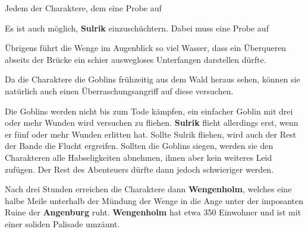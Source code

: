 Jedem der Charaktere, dem eine Probe auf 


Es ist auch möglich, \textbf{Sulrik} einzuschüchtern. Dabei muss eine Probe auf


Übrigens führt die Wenge im Augenblick so viel Wasser, dass ein Überqueren abseits der Brücke ein schier auswegloses Unterfangen darstellen dürfte. 

Da die Charaktere die Goblins frühzeitig aus dem Wald heraus sehen, können sie natürlich auch einen Überraschungsangriff auf diese versuchen.



Die Goblins werden nicht bis zum Tode kämpfen, ein einfacher Goblin mit drei oder mehr Wunden wird versuchen zu fliehen.
\textbf{Sulrik} flieht  allerdings erst, wenn er fünf oder mehr Wunden erlitten hat.
Sollte Sulrik fliehen, wird auch der Rest der Bande die Flucht ergreifen.
Sollten die Goblins siegen, werden sie den Charakteren alle Habseligkeiten abnehmen, ihnen aber kein weiteres Leid zufügen.
Der Rest des Abenteuers dürfte dann jedoch schwieriger werden. 

\platz


\platz



Nach drei Stunden erreichen die Charaktere dann \textbf{Wengenholm}, welches eine halbe Meile unterhalb der Mündung der Wenge in die Ange unter der imposanten Ruine der \textbf{Angenburg} ruht.
\textbf{Wengenholm} hat etwa 350 Einwohner und ist mit einer soliden Palisade umzäunt.
	

